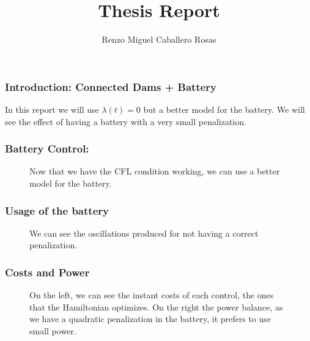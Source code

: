 \documentclass[aspectratio=169]{beamer}\usepackage[utf8]{inputenc}
\title{Thesis Report}
\subtitle{Renzo Miguel Caballero Rosas}
\begin{document}
\begin{frame}
\titlepage
\end{frame}

\begin{frame}\frametitle{Introduction: Connected Dams + Battery}
In this report we will use $\lambda(t)=0$ but a better model for the battery. We will see the effect of having a battery with a very small penalization.
\end{frame}

\begin{frame}\frametitle{Battery Control:}
\begin{figure}[ht!]
\centering
{}
\caption{Now that we have the CFL condition working, we can use a better model for the battery.}
\end{figure}
\end{frame}

\begin{frame}\frametitle{Usage of the battery}
\begin{figure}[ht!]
\centering
{}
\caption{We can see the oscillations produced for not having a correct penalization.}
\end{figure}
\end{frame}

\begin{frame}\frametitle{Costs and Power}
\begin{figure}[ht!]
\centering
{}
\caption{On the left, we can see the instant costs of each control, the ones that the Hamiltonian optimizes. On the right the power balance, as we have a quadratic penalization in the battery, it prefers to use small power.}
\end{figure}
\end{frame}

\begin{frame}
\begin{figure}[ht!]
\centering
{}
\end{figure}
\end{frame}

\begin{frame}
\begin{figure}[ht!]
\centering
{}
\end{figure}
\end{frame}
\end{document}
